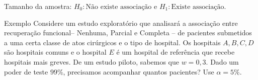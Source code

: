 \documentclass[9pt]{beamer}
\begin{document}
\begin{frame}{Tamanho da amostra: $H_0:\mbox{Não existe associação}$ e $H_1:\mbox{Existe associação} $.}

\large
\begin{block}{Exemplo}
	Considere um estudo exploratório que analisará a associação entre recuperação funcional-- Nenhuma, Parcial e Completa -- de pacientes submetidos a uma certa classe de atos cirúrgicos e o tipo de hospital. Os hospitais $A, B, C, D$ são hospitais comuns e o hospital $E$ é um hospital de referência que recebe hospitais mais greves. De um estudo piloto, sabemos que $w= 0,3$. Dado um poder de teste $99\%$, precisamos acompanhar quantos pacientes? Use $\alpha=5\%$.
\end{block}
\normalsize

\end{frame}
\end{document}
